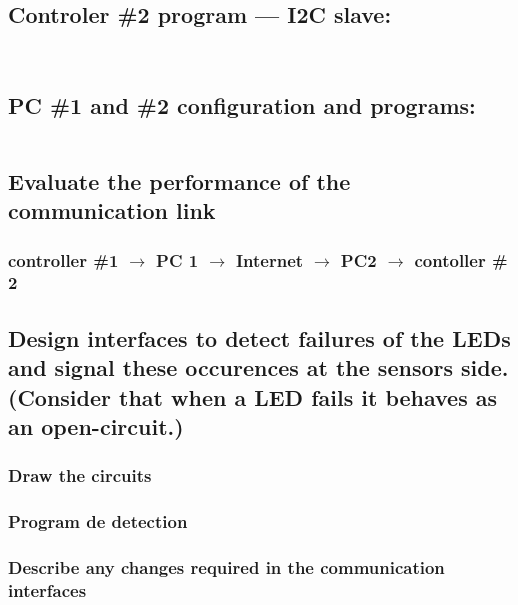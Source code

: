 \documentclass[10pt]{article}
\begin{document}
\inputminted[firstline=2]{cpp}{../arduino_sensor/arduino_sensor.ino}


\subsection{Controler \#2 program --- I2C slave:}

\inputminted{cpp}{../arduino_actuators/actuators.hpp}

\inputminted[firstline=2]{cpp}{../arduino_actuators/arduino_actuators.ino}

\subsection{PC \#1 and \#2 configuration and programs:}

\inputminted{go}{../serial_interface/main.go}

\subsection{Evaluate the performance of the communication link}

\subsubsection{controller \#1 $\rightarrow$ PC 1 $\rightarrow$ Internet
$\rightarrow$ PC2 $\rightarrow$ contoller \# 2}


\subsection{Design interfaces to detect failures of the LEDs and signal these
occurences at the sensors side. (Consider that when a LED fails it behaves as an
open-circuit.)}

\subsubsection{Draw the circuits}

\subsubsection{Program de detection}

\subsubsection{Describe any changes required in the communication interfaces}
\end{document}
